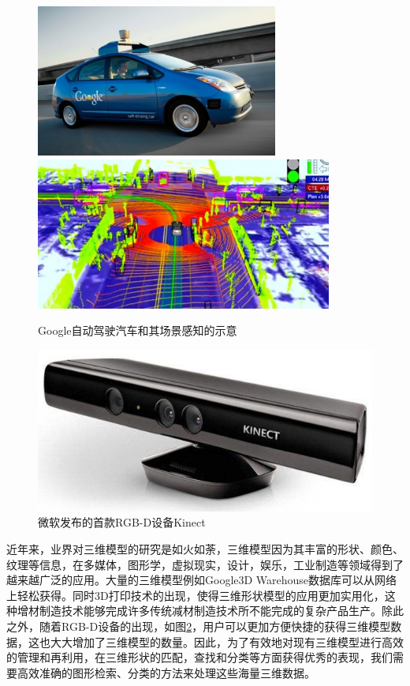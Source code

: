 \documentclass[twoside,UTF8]{nputhesis}
\begin{document}
\begin{figure}[tb]
\begin{center}
\includegraphics[width=0.4\linewidth, height=5cm]{figures/1-1a.jpg} 
\includegraphics[width=0.4\linewidth, height=5cm]{figures/1-1b.jpg}
\end{center} 
\vspace{-4mm}
\caption{Google自动驾驶汽车和其场景感知的示意} \label{fig_1-1}
\end{figure}

\begin{figure}[tb]
\begin{center}
\includegraphics[width=0.4\linewidth]{figures/1-2.jpg} 
\end{center} 
\vspace{-4mm}
\caption{微软发布的首款RGB-D设备Kinect} \label{fig_1-2}
\end{figure}

近年来，业界对三维模型的研究是如火如荼，三维模型因为其丰富的形状、颜色、纹理等信息，在多媒体，图形学，虚拟现实，设计，娱乐，工业制造等领域得到了越来越广泛的应用\cite{Tangelder2008A}。大量的三维模型例如Google3D Warehouse数据库可以从网络上轻松获得。同时3D打印技术的出现，使得三维形状模型的应用更加实用化，这种增材制造技术能够完成许多传统减材制造技术所不能完成的复杂产品生产。除此之外，随着RGB-D设备的出现，如图\ref{fig_1-2}，用户可以更加方便快捷的获得三维模型数据，这也大大增加了三维模型的数量。因此，为了有效地对现有三维模型进行高效的管理和再利用，在三维形状的匹配，查找和分类等方面获得优秀的表现，我们需要高效准确的图形检索、分类的方法来处理这些海量三维数据。
\end{document}
